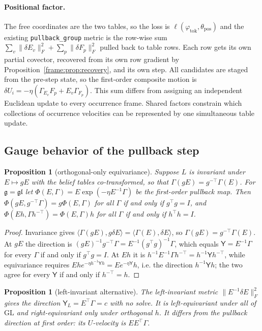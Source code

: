 \documentclass[11pt]{article}
\newtheorem{proposition}[theorem]{Proposition}
\theoremstyle{definition}
\theoremstyle{remark}
\providecommand{\GL}{\mathrm{GL}}
\providecommand{\gl}{\mathfrak{gl}}
\providecommand{\g}{\mathfrak{g}}
\providecommand{\ip}[2]{\langle #1, #2\rangle}
\begin{document}
\paragraph{Positional factor.} The free coordinates are the two tables, so the loss is $\ell(\varphi_{\mathrm{tok}},\theta_{\mathrm{pos}})$ and the existing \texttt{pullback\_group} metric is the row-wise sum $\sum_v\|\delta E_v\|_F^2+\sum_p\|\delta F_p\|_F^2$ pulled back to table rows. Each row gets its own partial covector, recovered from its own row gradient by Proposition~\ref{frame:prop:recovery}, and its own step. All candidates are staged from the pre-step state, so the first-order composite motion is $\delta U_i=-\eta(\Gamma_{E_v}F_{p}+E_v\Gamma_{F_p})$. This sum differs from assigning an independent Euclidean update to every occurrence frame. Shared factors constrain which collections of occurrence velocities can be represented by one simultaneous table update.

\subsection{Gauge behavior of the pullback step}\label{frame:sec:gauge-pullback}

\begin{proposition}[orthogonal-only equivariance]\label{frame:prop:orth}
Suppose $L$ is invariant under $E\mapsto gE$ with the belief tables co-transformed, so that $\Gamma(gE)=g^{-\top}\Gamma(E)$. For $\g=\gl$ let $\Phi(E,\Gamma)=E\exp(-\eta E^{-1}\Gamma)$ be the first-order pullback map. Then $\Phi(gE,g^{-\top}\Gamma)=g\Phi(E,\Gamma)$ for all $\Gamma$ if and only if $g^\top g=I$, and $\Phi(Eh,\Gamma h^{-\top})=\Phi(E,\Gamma)h$ for all $\Gamma$ if and only if $h^\top h=I$.
\end{proposition}
\begin{proof}
Invariance gives $\ip{\Gamma(gE)}{g\delta E}=\ip{\Gamma(E)}{\delta E}$, so $\Gamma(gE)=g^{-\top}\Gamma(E)$. At $gE$ the direction is $(gE)^{-1}g^{-\top}\Gamma=E^{-1}(g^\top g)^{-1}\Gamma$, which equals $\mathsf{Y}=E^{-1}\Gamma$ for every $\Gamma$ if and only if $g^\top g=I$. At $Eh$ it is $h^{-1}E^{-1}\Gamma h^{-\top}=h^{-1}\mathsf{Y} h^{-\top}$, while equivariance requires $Ehe^{-\eta h^{-1}\mathsf{Y} h}=Ee^{-\eta\mathsf{Y}}h$, i.e. the direction $h^{-1}\mathsf{Y} h$; the two agree for every $\mathsf{Y}$ if and only if $h^{-\top}=h$.
\end{proof}

\begin{proposition}[left-invariant alternative]\label{frame:prop:leftinv}
The left-invariant metric $\|E^{-1}\delta E\|_F^2$ gives the direction $\mathsf{Y}_L=E^\top\Gamma=c$ with no solve. It is left-equivariant under all of $\GL$ and right-equivariant only under orthogonal $h$. It differs from the pullback direction at first order: its $U$-velocity is $EE^\top\Gamma$.
\end{proposition}
\end{document}
